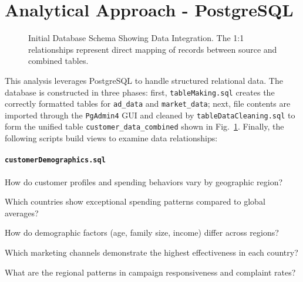 \documentclass[12pt,a4paper]{article}
\newcommand{\textittt}[1]{\texttt{#1}}
\begin{document}
\section{Analytical Approach - PostgreSQL}
\begin{figure}[h!]
\centering
{}
\vspace{5pt}
\caption{Initial Database Schema Showing Data Integration. The 1:1 relationships represent direct mapping of records between source and combined tables.}
\label{fig:initial-schema}
\end{figure}
\vspace{10pt}
\noindent This analysis leverages PostgreSQL to handle structured relational data. The database is constructed in three phases: first, \textittt{tableMaking.sql} creates the correctly formatted tables for \textittt{ad\_data} and \textittt{market\_data}; next, file contents are imported through the \textittt{PgAdmin4} GUI and cleaned by \textittt{tableDataCleaning.sql} to form the unified table \textittt{customer\_data\_combined} shown in Fig.~\ref{fig:initial-schema}. Finally, the following scripts build views to examine data relationships:\\
\paragraph{\textittt{customerDemographics.sql}}
\begin{itemize}
\begin{minipage}{\textwidth}
    \item How do customer profiles and spending behaviors vary by geographic region?
    \item Which countries show exceptional spending patterns compared to global averages?
    \item How do demographic factors (age, family size, income) differ across regions?
    \item Which marketing channels demonstrate the highest effectiveness in each country?
    \item What are the regional patterns in campaign responsiveness and complaint rates?
\end{minipage}
\end{itemize}
\clearpage
\newpage
\end{document}
